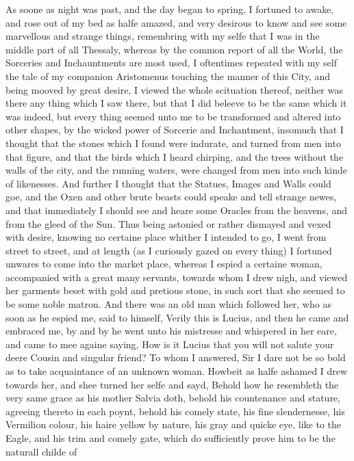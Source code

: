 As soone as night was past, and the day began to spring, I fortuned to awake,
and rose out of my bed as halfe amazed, and very desirous to know and see some
marvellous and strange things, remembring with my selfe that I was in the
middle part of all Thessaly, whereas by the common report of all the World, the
Sorceries and Inchauntments are most used, I oftentimes repeated with my self
the tale of my companion Aristomenus touching the manner of this City, and
being mooved by great desire, I viewed the whole scituation thereof, neither
was there any thing which I saw there, but that I did beleeve to be the same
which it was indeed, but every thing seemed unto me to be transformed and
altered into other shapes, by the wicked power of Sorcerie and Inchantment,
insomuch that I thought that the stones which I found were indurate, and turned
from men into that figure, and that the birds which I heard chirping, and the
trees without the walls of the city, and the running waters, were changed from
men into such kinde of likenesses. And further I thought that the Statues,
Images and Walls could goe, and the Oxen and other brute beasts could speake
and tell strange newes, and that immediately I should see and heare some
Oracles from the heavens, and from the gleed of the Sun. Thus being astonied or
rather dismayed and vexed with desire, knowing no certaine place whither I
intended to go, I went from street to street, and at length (as I curiously
gazed on every thing) I fortuned unwares to come into the market place, whereas
I espied a certaine woman, accompanied with a great many servants, towards whom
I drew nigh, and viewed her garments beset with gold and pretious stone, in
such sort that she seemed to be some noble matron. And there was an old man
which followed her, who as soon as he espied me, said to himself, Verily this
is Lucius, and then he came and embraced me, by and by he went unto his
mistresse and whispered in her eare, and came to mee againe saying, How is it
Lucius that you will not salute your deere Cousin and singular friend? To whom
I answered, Sir I dare not be so bold as to take acquaintance of an unknown
woman. Howbeit as halfe ashamed I drew towards her, and shee turned her selfe
and sayd, Behold how he resembleth the very same grace as his mother Salvia
doth, behold his countenance and stature, agreeing thereto in each poynt,
behold his comely state, his fine slendernesse, his Vermilion colour, his haire
yellow by nature, his gray and quicke eye, like to the Eagle, and his trim and
comely gate, which do sufficiently prove him to be the naturall childe of
